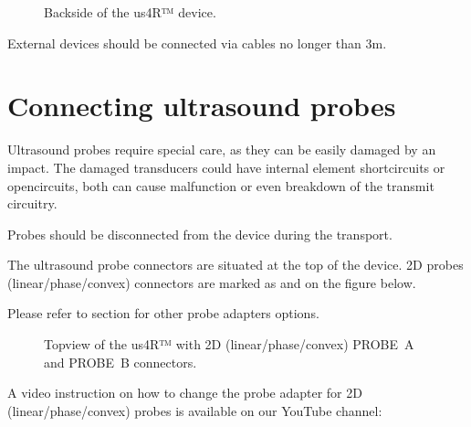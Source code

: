 \documentclass[letterpaper,10pt,english]{sphinxmanual}
\begin{document}
\begin{figure}[htbp]
\centering
\capstart

\noindent{}
\caption{Back\sphinxhyphen{}side of the us4R™ device.}\label{\detokenize{content/hardware:id2}}\end{figure}

\sphinxAtStartPar
{} External devices should be connected via cables no
longer than 3m.


\section{Connecting ultrasound probes}
\label{\detokenize{content/hardware:connecting-ultrasound-probes}}
\sphinxAtStartPar
Ultrasound probes require special care, as they can be easily damaged by
an impact. The damaged transducers could have internal element
short\sphinxhyphen{}circuits or open\sphinxhyphen{}circuits, both can cause malfunction or even
breakdown of the  transmit circuitry. 

\sphinxAtStartPar
Probes should be disconnected from the device during the transport.

\sphinxAtStartPar
The ultrasound probe connectors are situated at the top of the device.
2D probes (linear/phase/convex) connectors are marked as 
and  on the figure below.

\sphinxAtStartPar
Please refer to section  for other probe
adapters options.

\begin{figure}[htbp]
\centering
\capstart

\noindent{}
\caption{Top\sphinxhyphen{}view of the us4R™ with 2D (linear/phase/convex) PROBE A and PROBE B connectors.}\label{\detokenize{content/hardware:id3}}\end{figure}

\sphinxAtStartPar
A video instruction on how to change the probe adapter for 2D (linear/phase/convex) probes is available on our YouTube channel:

\sphinxAtStartPar
{}
\end{document}
